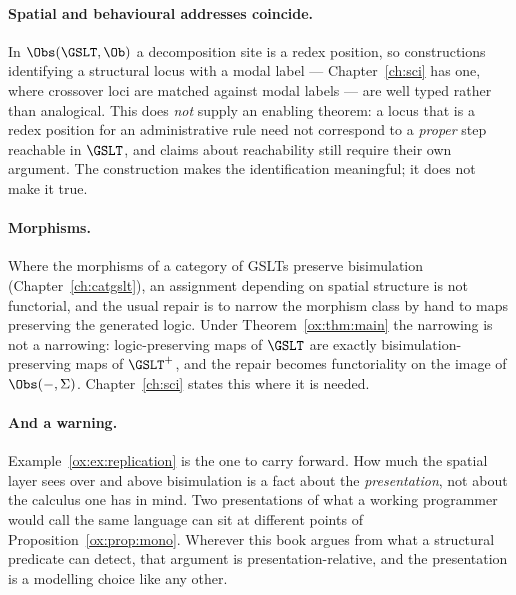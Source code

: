 \paragraph{Spatial and behavioural addresses coincide.}
In $\Obs(\GSLT,\Ob)$ a decomposition site is a redex position, so constructions
identifying a structural locus with a modal label --- Chapter~\ref{ch:sci} has one,
where crossover loci are matched against modal labels --- are well typed rather than
analogical. This does \emph{not} supply an enabling theorem: a locus that is a redex
position for an administrative rule need not correspond to a \emph{proper} step
reachable in $\GSLT$, and claims about reachability still require their own
argument. The construction makes the identification meaningful; it does not make it
true.

\paragraph{Morphisms.}
Where the morphisms of a category of GSLTs preserve bisimulation
(Chapter~\ref{ch:catgslt}), an assignment depending on spatial structure is not
functorial, and the usual repair is to narrow the morphism class by hand to maps
preserving the generated logic. Under Theorem~\ref{ox:thm:main} the narrowing is not
a narrowing: logic-preserving maps of $\GSLT$ are exactly bisimulation-preserving
maps of $\GSLT^{+}$, and the repair becomes functoriality on the image of
$\Obs(-,\Sigma)$. Chapter~\ref{ch:sci} states this where it is needed.

\paragraph{And a warning.}
Example~\ref{ox:ex:replication} is the one to carry forward. How much the spatial
layer sees over and above bisimulation is a fact about the \emph{presentation}, not
about the calculus one has in mind. Two presentations of what a working programmer
would call the same language can sit at different points of
Proposition~\ref{ox:prop:mono}. Wherever this book argues from what a structural
predicate can detect, that argument is presentation-relative, and the presentation
is a modelling choice like any other.
